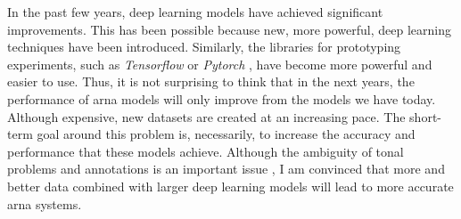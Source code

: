 

In the past few years, deep learning models have achieved
significant improvements. This has been possible because
new, more powerful, deep learning techniques have been
introduced. Similarly, the libraries for prototyping
experiments, such as \emph{Tensorflow}
\parencite{abadi2016tensorflow} or \emph{Pytorch}
\parencite{paszke2019pytorch}, have become more powerful and
easier to use. Thus, it is not surprising to think that in
the next years, the performance of \gls{arna} models will
only improve from the models we have today. Although
expensive, new datasets are created at an increasing pace.
The short-term goal around this problem is, necessarily, to
increase the accuracy and performance that these models
achieve. Although the ambiguity of tonal problems and
annotations is an important issue
\parencite{ju2021addressing}, I am convinced that more and
better data combined with larger deep learning models will
lead to more accurate \gls{arna} systems.

